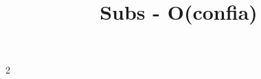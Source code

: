 \documentclass[10pt]{article}
\title{\vspace{-4ex}\Large{Subs - O(confia)}}
\author{}
\date{}
\begin{document}
\begin{landscape}
\begin{multicols}{2}

\maketitle
\vspace{-13ex}
\tableofcontents
\pagestyle{fancy}



\end{multicols}
\end{landscape}
\end{document}
